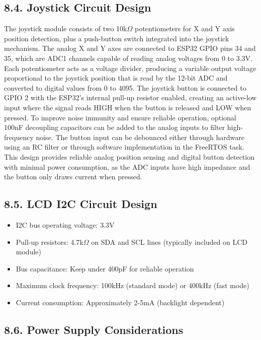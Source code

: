\documentclass[12pt]{article}
\begin{document}
\subsection*{8.4. Joystick Circuit Design}

The joystick module consists of two 10k$\Omega$ potentiometers for X and Y axis position detection, plus a push-button switch integrated into the joystick mechanism. The analog X and Y axes are connected to ESP32 GPIO pins 34 and 35, which are ADC1 channels capable of reading analog voltages from 0 to 3.3V. Each potentiometer acts as a voltage divider, producing a variable output voltage proportional to the joystick position that is read by the 12-bit ADC and converted to digital values from 0 to 4095. The joystick button is connected to GPIO 2 with the ESP32's internal pull-up resistor enabled, creating an active-low input where the signal reads HIGH when the button is released and LOW when pressed. To improve noise immunity and ensure reliable operation, optional 100nF decoupling capacitors can be added to the analog inputs to filter high-frequency noise. The button input can be debounced either through hardware using an RC filter or through software implementation in the FreeRTOS task. This design provides reliable analog position sensing and digital button detection with minimal power consumption, as the ADC inputs have high impedance and the button only draws current when pressed.

\subsection*{8.5. LCD I2C Circuit Design}

\begin{itemize}
    \item I2C bus operating voltage: 3.3V
    \item Pull-up resistors: 4.7k$\Omega$ on SDA and SCL lines (typically included on LCD module)
    \item Bus capacitance: Keep under 400pF for reliable operation
    \item Maximum clock frequency: 100kHz (standard mode) or 400kHz (fast mode)
    \item Current consumption: Approximately 2-5mA (backlight dependent)
\end{itemize}

\subsection*{8.6. Power Supply Considerations}
\end{document}
